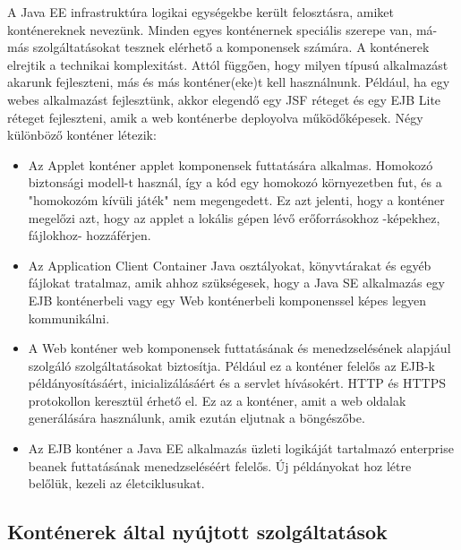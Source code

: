 \documentclass[centeredchapter]{thesis-ekf}
\theoremstyle{definition}
\theoremstyle{remark}
\begin{document}
A Java EE infrastruktúra logikai egységekbe került felosztásra, amiket konténereknek nevezünk. Minden egyes konténernek speciális szerepe van, má-más szolgáltatásokat tesznek elérhető a komponensek számára. A konténerek elrejtik a technikai komplexitást.
Attól függően, hogy milyen típusú alkalmazást akarunk fejleszteni, más és más konténer(eke)t kell használnunk. Például, ha egy webes alkalmazást fejlesztünk, akkor elegendő egy JSF réteget és egy EJB Lite réteget fejleszteni, amik a web konténerbe deployolva működőképesek.
Négy különböző konténer létezik:
\begin{itemize}
	\item Az Applet konténer applet komponensek futtatására alkalmas. Homokozó biztonsági modell-t használ, így a kód egy homokozó környezetben fut, és a "homokozóm kívüli játék" nem megengedett.
	Ez azt jelenti, hogy a konténer megelőzi azt, hogy az applet a lokális gépen lévő erőforrásokhoz -képekhez, fájlokhoz- hozzáférjen.
	\item Az Application Client Container Java osztályokat, könyvtárakat és egyéb fájlokat tratalmaz, amik ahhoz szükségesek, hogy a Java SE alkalmazás egy EJB konténerbeli vagy egy Web konténerbeli komponenssel képes legyen kommunikálni.
	\item A Web konténer web komponensek futtatásának és menedzselésének alapjául szolgáló szolgáltatásokat biztosítja. Például ez a konténer felelős az EJB-k példányosításáért, inicializálásáért és a servlet hívásokért. HTTP és HTTPS protokollon keresztül érhető el. Ez az a konténer, amit a web oldalak generálására használunk, amik ezután eljutnak a böngészőbe.
	\item Az EJB konténer a Java EE alkalmazás üzleti logikáját tartalmazó enterprise beanek futtatásának menedzseléséért felelős. Új példányokat hoz létre belőlük, kezeli az életciklusukat.
\end{itemize}

\subsection{Konténerek által nyújtott szolgáltatások}
\end{document}
